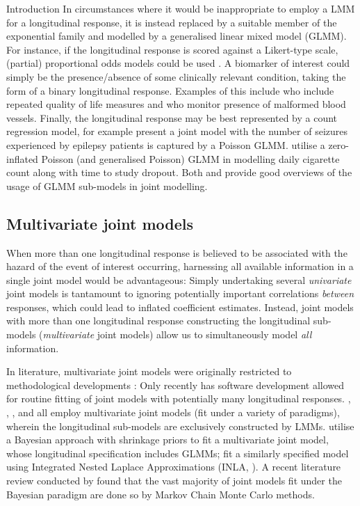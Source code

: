\begin{chapter}{\label{cha:intro}Introduction}
  In circumstances where it would be inappropriate to employ a LMM for a longitudinal response, it is instead replaced by a suitable member of the exponential family and modelled by a generalised linear mixed model (GLMM). For instance, if the longitudinal response is scored against a Likert-type scale, (partial) proportional odds models could be used \citep{Li2010, Alam2021}. A biomarker of interest could simply be the presence/absence of some clinically relevant condition, taking the form of a binary longitudinal response. Examples of this include \citet{Choi2015} who include repeated quality of life measures and \citet{Rustand2023} who monitor presence of malformed blood vessels. Finally, the longitudinal response may be best represented by a count regression model, for example \citet{Sunethra2018} present a joint model with the number of seizures experienced by epilepsy patients is captured by a Poisson GLMM. \citet{Zhu2018} utilise a zero-inflated Poisson (and generalised Poisson) GLMM in modelling daily cigarette count along with time to study dropout. Both \citet{Hickey2016} and \citet{Alsefri2020} provide good overviews of the usage of GLMM sub-models in joint modelling.
  
  \subsection{Multivariate joint models}\label{sec:intro-evolution-multivariate}
  When more than one longitudinal response is believed to be associated with the hazard of the event of interest occurring, harnessing all available information in a single joint model would be advantageous: Simply undertaking several \textit{univariate} joint models is tantamount to ignoring potentially important correlations \textit{between} responses, which could lead to inflated coefficient estimates. Instead, joint models with more than one longitudinal response constructing the longitudinal sub-models (\textit{multivariate} joint models) allow us to simultaneously model \textit{all} information.
  
  In literature, multivariate joint models were originally restricted to methodological developments \citep{Lin2002}: Only recently has software development allowed for routine fitting of joint models with potentially many longitudinal responses. \citet{Hickey2018}, \citet{Long2018}, \citet{Andrinopoulou2020}, and \citet{Philipson2020} all employ multivariate joint models (fit under a variety of paradigms), wherein the longitudinal sub-models are exclusively constructed by LMMs. \citet{PBCapp2} utilise a Bayesian approach with shrinkage priors to fit a multivariate joint model, whose longitudinal specification includes GLMMs; \citet{Rustand2023} fit a similarly specified model using Integrated Nested Laplace Approximations (INLA, \citet{R-INLA}). A recent literature review conducted by \citet{Alsefri2020} found that the vast majority of joint models fit under the Bayesian paradigm are done so by Markov Chain Monte Carlo methods.
  

\end{chapter}
